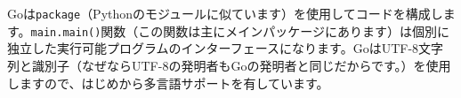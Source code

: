 Goは\texttt{package}（Pythonのモジュールに似ています）を使用してコードを構成します。\texttt{main.main()}関数（この関数は主にメインパッケージにあります）は個別に独立した実行可能プログラムのインターフェースになります。GoはUTF-8文字列と識別子（なぜならUTF-8の発明者もGoの発明者と同じだからです。）を使用しますので、はじめから多言語サポートを有しています。
